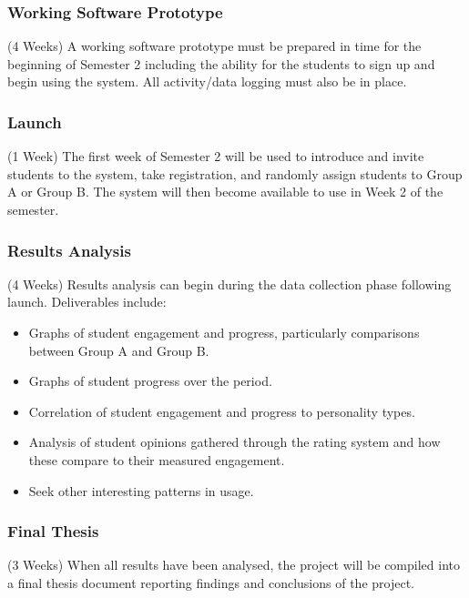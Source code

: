 \subsubsection{Working Software Prototype}
(4 Weeks)
A working software prototype must be prepared in time for the beginning of
Semester 2 including the ability for the students to sign up and begin using
the system. All activity/data logging must also be in place.

\subsubsection{Launch}
(1 Week)
The first week of Semester 2 will be used to introduce and invite students to
the system, take registration, and randomly assign students to Group A or Group
B. The system will then become available to use in Week 2 of the semester.

\subsubsection{Results Analysis}
(4 Weeks)
Results analysis can begin during the data collection phase following launch.
Deliverables include:
\begin{itemize}
	\item Graphs of student engagement and progress, particularly comparisons
		between Group A and Group B.
	\item Graphs of student progress over the period.
	\item Correlation of student engagement and progress to personality types.
	\item Analysis of student opinions gathered through the rating system and
		how these compare to their measured engagement.
	\item Seek other interesting patterns in usage.
\end{itemize}

\subsubsection{Final Thesis}
(3 Weeks)
When all results have been analysed, the project will be compiled into a final
thesis document reporting findings and conclusions of the project.
